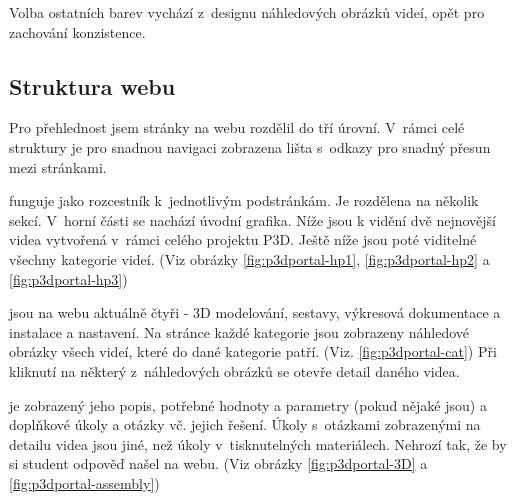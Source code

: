 Volba ostatních barev vychází z~designu náhledových obrázků videí, opět pro zachování konzistence.

\subsection{Struktura webu}
Pro přehlednost jsem stránky na webu rozdělil do tří úrovní. 
V~rámci celé struktury je pro snadnou navigaci zobrazena lišta s~odkazy pro snadný přesun mezi stránkami.

\noindent{} funguje jako rozcestník k~jednotlivým podstránkám. Je rozdělena na několik sekcí. V~horní části se nachází úvodní grafika. Níže jsou k vidění dvě nejnovější videa vytvořená v~rámci celého projektu P3D. Ještě níže jsou poté viditelné všechny kategorie videí. (Viz obrázky \ref{fig:p3dportal-hp1}, \ref{fig:p3dportal-hp2} a \ref{fig:p3dportal-hp3})

\noindent{} jsou na webu aktuálně čtyři - 3D modelování, sestavy, výkresová dokumentace a instalace a nastavení. Na stránce každé kategorie jsou zobrazeny náhledové obrázky všech videí, které do dané kategorie patří. (Viz. \autoref{fig:p3dportal-cat})
Při kliknutí na některý z~náhledových obrázků se otevře detail daného videa. 

\noindent{} je zobrazený jeho popis, potřebné hodnoty a parametry (pokud nějaké jsou) a doplňkové úkoly a otázky vč. jejich řešení. Úkoly s~otázkami zobrazenými na detailu videa jsou jiné, než úkoly v~tisknutelných materiálech. Nehrozí tak, že by si student odpověď našel na webu. (Viz obrázky \ref{fig:p3dportal-3D} a \ref{fig:p3dportal-assembly})

